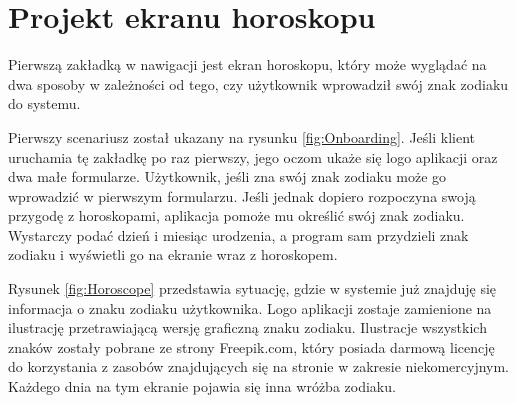 \section*{Projekt ekranu horoskopu}
Pierwszą zakładką w nawigacji jest ekran horoskopu, który może wyglądać na dwa sposoby w zależności od tego, czy użytkownik wprowadził swój znak zodiaku do systemu.

Pierwszy scenariusz został ukazany na rysunku \ref{fig:Onboarding}. Jeśli klient uruchamia tę zakładkę po raz pierwszy, jego oczom ukaże się logo aplikacji oraz dwa małe formularze. Użytkownik, jeśli zna swój znak zodiaku może go wprowadzić w pierwszym formularzu. Jeśli jednak dopiero rozpoczyna swoją przygodę z horoskopami, aplikacja pomoże mu określić swój znak zodiaku. Wystarczy podać dzień i miesiąc urodzenia, a program sam przydzieli znak zodiaku i wyświetli go na ekranie wraz z horoskopem.

Rysunek \ref{fig:Horoscope} przedstawia sytuację, gdzie w systemie już znajduję się informacja o znaku zodiaku użytkownika. Logo aplikacji zostaje zamienione na ilustrację przetrawiającą wersję graficzną znaku zodiaku. Ilustracje wszystkich znaków zostały pobrane ze strony Freepik.com, który posiada darmową licencję do korzystania z zasobów znajdujących się na stronie w zakresie niekomercyjnym. Każdego dnia na tym ekranie pojawia się inna wróżba zodiaku.

